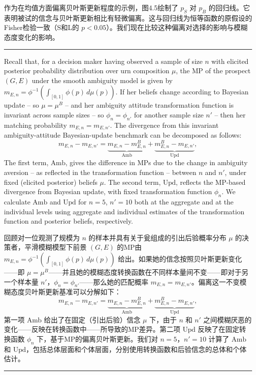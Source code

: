 \documentclass[12pt,a4paper]{article}
\newenvironment{original}
  {\par\vspace{0.5em}\noindent\color{black}\ignorespaces}
  {\par\vspace{0.3em}}
\newenvironment{translation}
  {\par\noindent\color{transblue}\ignorespaces}
  {\par\vspace{0.8em}\hrule\vspace{0.5em}}
\begin{document}
\begin{translation}
作为在均值方面偏离贝叶斯更新程度的示例，图4.5绘制了 $p_S$ 对 $p_B$ 的回归线。它表明被试的信念与贝叶斯更新相比有轻微偏离。这与回归线为恒等函数的原假设的Fisher检验一致（S和L的 $p < 0.05$）。我们现在比较这种偏离对选择的影响与模糊态度变化的影响。
\end{translation}

\begin{original}
Recall that, for a decision maker having observed a sample of size $n$ with elicited posterior probability distribution over urn composition $\mu$, the MP of the prospect $(G, E)$ under the smooth ambiguity model is given by $m_{E,n} = \phi^{-1}(\int_{[0,1]} \phi(p)\, d\mu(p))$. If her beliefs change according to Bayesian update -- so $\mu = \mu^B$ -- and her ambiguity attitude transformation function is invariant across sample sizes -- so $\phi_n = \phi_{n'}$ for another sample size $n'$ -- then her matching probability $m_{E,n} = m_{E,n'}$. The divergence from this invariant ambiguity-attitude Bayesian-update benchmark can be decomposed as follows:
\begin{equation}
m_{E,n} - m_{E,n'} = \underbrace{m_{E,n} - m^B_{E,n}}_{\text{Amb}} + \underbrace{m^B_{E,n} - m_{E,n'}}_{\text{Upd}}, \label{eq:decomp}
\end{equation}
The first term, $\text{Amb}$, gives the difference in MPs due to the change in ambiguity aversion -- as reflected in the transformation function -- between $n$ and $n'$, under fixed (elicited posterior) beliefs $\mu$. The second term, $\text{Upd}$, reflects the MP-based divergence from Bayesian update, with fixed transformation function $\phi_n$. We calculate $\text{Amb}$ and $\text{Upd}$ for $n = 5$, $n' = 10$ both at the aggregate and at the individual levels using aggregate and individual estimates of the transformation function and posterior beliefs, respectively.
\end{original}

\begin{translation}
回顾对一位观测了规模为 $n$ 的样本并具有关于瓮组成的引出后验概率分布 $\mu$ 的决策者，平滑模糊模型下前景 $(G, E)$ 的MP由 $m_{E,n} = \phi^{-1}(\int_{[0,1]} \phi(p)\, d\mu(p))$ 给出。如果她的信念按照贝叶斯更新变化——即 $\mu = \mu^B$——并且她的模糊态度转换函数在不同样本量间不变——即对于另一个样本量 $n'$，$\phi_n = \phi_{n'}$——那么她的匹配概率 $m_{E,n} = m_{E,n'}$。偏离这一不变模糊态度贝叶斯更新基准可以分解如下：
\begin{equation}
m_{E,n} - m_{E,n'} = \underbrace{m_{E,n} - m^B_{E,n}}_{\text{Amb}} + \underbrace{m^B_{E,n} - m_{E,n'}}_{\text{Upd}},
\end{equation}
第一项 $\text{Amb}$ 给出了在固定（引出后验）信念 $\mu$ 下，由于 $n$ 和 $n'$ 之间模糊厌恶的变化——反映在转换函数中——所导致的MP差异。第二项 $\text{Upd}$ 反映了在固定转换函数 $\phi_n$ 下，基于MP的偏离贝叶斯更新。我们对 $n = 5$，$n' = 10$ 计算了 $\text{Amb}$ 和 $\text{Upd}$，包括总体层面和个体层面，分别使用转换函数和后验信念的总体和个体估计。
\end{translation}
\end{document}
